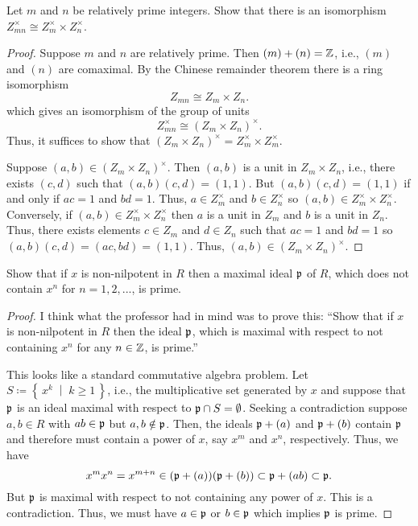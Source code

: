 \begin{problem}
Let $m$ and $n$ be relatively prime integers. Show that there is an
isomorphism $Z_{mn}^\times\cong Z_m^\times\times Z_n^\times$.
\end{problem}
\begin{proof}
Suppose $m$ and $n$ are relatively prime. Then $(m)+(n)=\mathbb{Z}$, i.e., $(m)$
and $(n)$ are comaximal. By the Chinese remainder theorem there is a ring
isomorphism
\[
Z_{mn}\cong Z_m\times Z_n.
\]
which gives an isomorphism of the group of units
\[
Z_{mn}^\times\cong\left(Z_m\times Z_n\right)^\times.
\]
Thus, it suffices to show that $\left(Z_m\times
  Z_n\right)^\times=Z_m^\times\times Z_m^\times$.

Suppose $(a,b)\in\left(Z_m\times Z_n\right)^\times$. Then $(a,b)$ is a unit
in $Z_m\times Z_n$, i.e., there exists $(c,d)$ such that
$(a,b)(c,d)=(1,1)$. But $(a,b)(c,d)=(1,1)$ if and only if $ac=1$ and
$bd=1$. Thus, $a\in Z_m^\times$ and $b\in Z_n^\times$ so $(a,b)\in
Z_m^\times\times Z_n^\times$. Conversely, if $(a,b)\in Z_m^\times\times
Z_n^\times$ then $a$ is a unit in $Z_m$ and $b$ is a unit in $Z_n$. Thus,
there exists elements $c\in Z_m$ and $d\in Z_n$ such that $ac=1$ and
$bd=1$ so $(a,b)(c,d)=(ac,bd)=(1,1)$. Thus, $(a,b)\in\left(Z_m\times
  Z_n\right)^\times$.
\end{proof}

\begin{problem}
Show that if $x$ is non-nilpotent in $R$ then a maximal ideal $\mathfrak{p}$ of
$R$, which does not contain $x^n$ for $n=1,2,...$, is prime.
\end{problem}
\begin{proof}
I think what the professor had in mind was to prove this: ``Show that if
$x$ is non-nilpotent in $R$ then the ideal $\mathfrak{p}$, which is maximal with
respect to not containing $x^n$ for any $n\in\mathbb{Z}$, is prime.''

This looks like a standard commutative algebra problem. Let
$S\coloneqq\left\{\,x^k\;\middle|\;k\geq 1\,\right\}$, i.e., the
multiplicative set generated by $x$ and suppose that $\mathfrak{p}$ is an ideal
maximal with respect to $\mathfrak{p}\cap S=\emptyset$. Seeking a contradiction
suppose $a,b\in R$ with $ab\in\mathfrak{p}$ but $a,b\notin\mathfrak{p}$. Then, the
ideals $\mathfrak{p}+(a)$ and $\mathfrak{p}+(b)$ contain $\mathfrak{p}$ and therefore must
contain a power of $x$, say $x^m$ and $x^n$, respectively. Thus, we have
\[
x^mx^n=x^{m+n}\in(\mathfrak{p}+(a))(\mathfrak{p}+(b))\subset\mathfrak{p}+(ab)\subset\mathfrak{p}.
\]
But $\mathfrak{p}$ is maximal with respect to not containing any power of
$x$. This is a contradiction. Thus, we must have $a\in\mathfrak{p}$ or
$b\in\mathfrak{p}$ which implies $\mathfrak{p}$ is prime.
\end{proof}

